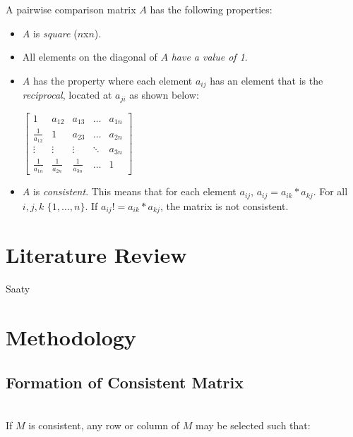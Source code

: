 \documentclass[12pt]{amsart}
\theoremstyle{definition}
\begin{document}
A pairwise comparison matrix $A$ has the following properties:
\begin{itemize}
\item $A$ is \textit{square} ($n$x$n$).
\item All elements on the diagonal of $A$ \textit{have a value of 1}.
\item $A$ has the property where each element $a_{ij}$ has an element that is the \textit{reciprocal}, located at $a_{ji}$ as shown below:

\begin{center}


$
\begin{bmatrix}
    1 & a_{12} & a_{13} & \dots  & a_{1n} \\
    \frac{1}{a_{12}} & 1 & a_{23} & \dots  & a_{2n} \\
    \vdots & \vdots & \vdots & \ddots & a_{3n} \\
    \frac{1}{a_{1n}} & \frac{1}{a_{2n}} & \frac{1}{a_{3n}} & \dots  & 1
\end{bmatrix}
$
\end{center}

\item $A$ is \textit{consistent}.  This means that for each element $a_{ij}$, $a_{ij}=a_{ik}*a_{kj}$.  For all $i,j,k$ $\{1,\dots,n\}$. If $a_{ij}!=a_{ik}*a_{kj}$, the matrix is not consistent.
\end{itemize}

\cite{saaty2000fundamentals}



\section{Literature Review}

%
Saaty

\section{Methodology}

\subsection{Formation of Consistent Matrix}~\\
If $M$ is consistent, any row or column of $M$ may be selected such that:
\end{document}
